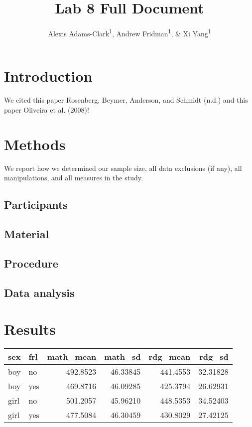 \documentclass[man]{apa6}
\title{Lab 8 Full Document}
\author{Alexis Adams-Clark\textsuperscript{1}, Andrew
Fridman\textsuperscript{1}, \& Xi Yang\textsuperscript{1}}
\date{}
\affiliation{
\vspace{0.5cm}
\textsuperscript{1} University of Oregon}
\begin{document}
\maketitle

\section{Introduction}\label{introduction}

We cited this paper Rosenberg, Beymer, Anderson, and Schmidt (n.d.) and
this paper Oliveira et al. (2008)!

\section{Methods}\label{methods}

We report how we determined our sample size, all data exclusions (if
any), all manipulations, and all measures in the study.

\subsection{Participants}\label{participants}

\subsection{Material}\label{material}

\subsection{Procedure}\label{procedure}

\subsection{Data analysis}\label{data-analysis}

\section{Results}\label{results}

\begin{tabular}{l|l|r|r|r|r}
\hline
sex & frl & math\_mean & math\_sd & rdg\_mean & rdg\_sd\\
\hline
boy & no & 492.8523 & 46.33845 & 441.4553 & 32.31828\\
\hline
boy & yes & 469.8716 & 46.09285 & 425.3794 & 26.62931\\
\hline
girl & no & 501.2057 & 45.96210 & 448.5353 & 34.52403\\
\hline
girl & yes & 477.5084 & 46.30459 & 430.8029 & 27.42125\\
\hline
\end{tabular}
\end{document}
